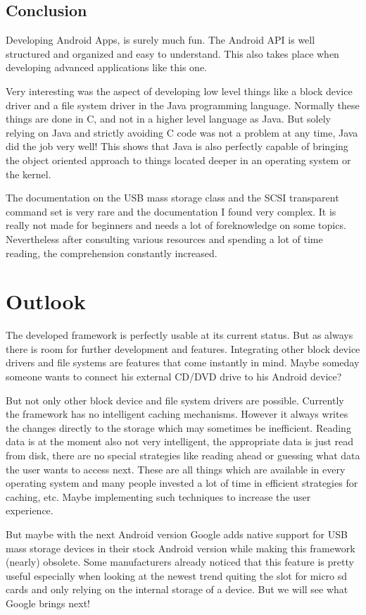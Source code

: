 \section{Conclusion}

Developing Android Apps, is surely much fun. The Android API is well structured and organized and easy to understand. This also takes place when developing advanced applications like this one. 

Very interesting was the aspect of developing low level things like a block device driver and a file system driver in the Java programming language. Normally these things are done in C, and not in a higher level language as Java. But solely relying on Java and strictly avoiding C code was not a problem at any time, Java did the job very well! This shows that Java is also perfectly capable of bringing the object oriented approach to things located deeper in an operating system or the kernel.

The documentation on the USB mass storage class and the SCSI transparent command set is very rare and the documentation I found very complex. It is really not made for beginners and needs a lot of foreknowledge on some topics. Nevertheless after consulting various resources and spending a lot of time reading, the comprehension constantly increased.

\chapter{Outlook}

The developed framework is perfectly usable at its current status. But as always there is room for further development and features. Integrating other block device drivers and file systems are features that come instantly in mind. Maybe someday someone wants to connect his external CD/DVD drive to his Android device?

But not only other block device and file system drivers are possible. Currently the framework has no intelligent caching mechanisms. However it always writes the changes directly to the storage which may sometimes be inefficient. Reading data is at the moment also not very intelligent, the appropriate data is just read from disk, there are no special strategies like reading ahead or guessing what data the user wants to access next. These are all things which are available in every operating system and many people invested a lot of time in efficient strategies for caching, etc. Maybe implementing such techniques to increase the user experience.

But maybe with the next Android version Google adds native support for USB mass storage devices in their stock Android version while making this framework (nearly) obsolete. Some manufacturers already noticed that this feature is pretty useful especially when looking at the newest trend quiting the slot for micro sd cards and only relying on the internal storage of a device. But we will see what Google brings next!